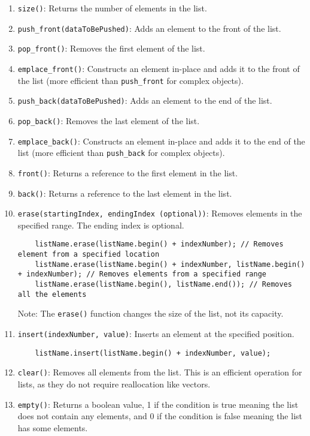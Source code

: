 \documentclass{article}
\begin{document}
\begin{enumerate}
    \item \texttt{size()}: Returns the number of elements in the list.
    \item \texttt{push\_front(dataToBePushed)}: Adds an element to the front of the list.
    \item \texttt{pop\_front()}: Removes the first element of the list.
    \item \texttt{emplace\_front()}: Constructs an element in-place and adds it to the front of the list (more efficient than \texttt{push\_front} for complex objects).
    \item \texttt{push\_back(dataToBePushed)}: Adds an element to the end of the list.
    \item \texttt{pop\_back()}: Removes the last element of the list.
    \item \texttt{emplace\_back()}: Constructs an element in-place and adds it to the end of the list (more efficient than \texttt{push\_back} for complex objects).
    \item \texttt{front()}: Returns a reference to the first element in the list.
    \item \texttt{back()}: Returns a reference to the last element in the list.
    \item \texttt{erase(startingIndex, endingIndex (optional))}: Removes elements in the specified range. The ending index is optional.
    
    \begin{lstlisting}
    listName.erase(listName.begin() + indexNumber); // Removes element from a specified location
    listName.erase(listName.begin() + indexNumber, listName.begin() + indexNumber); // Removes elements from a specified range
    listName.erase(listName.begin(), listName.end()); // Removes all the elements
    \end{lstlisting}

    Note: The \texttt{erase()} function changes the size of the list, not its capacity.

    \item \texttt{insert(indexNumber, value)}: Inserts an element at the specified position.
    \begin{lstlisting}
    listName.insert(listName.begin() + indexNumber, value);
    \end{lstlisting}

    \item \texttt{clear()}: Removes all elements from the list. This is an efficient operation for lists, as they do not require reallocation like vectors.
    \item \texttt{empty()}: Returns a boolean value, 1 if the condition is true meaning the list does not contain any elements, and 0 if the condition is false meaning the list has some elements.


\end{enumerate}
\end{document}
